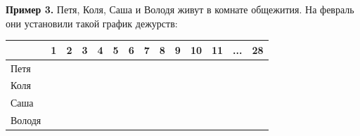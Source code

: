 \begin{multicols}{2}
\textbf{Пример 3.} Петя, Коля, Саша и Володя живут в комнате общежития. На февраль
они установили такой график дежурств:\\
\begin{tabular}{ | l | l | l | l | l | l |l | l | l | l | l | l |l | l |}
\hline
& 1& 2& 3& 4& 5& 6& 7& 8& 9& 10& 11& ... & 28\\ \hline
Петя& \cellcolor{black}& & & & \cellcolor{black}& & & & \cellcolor{black}& & & &\\ \hline
Коля& & \cellcolor{black}& & & & \cellcolor{black}& & & & \cellcolor{black}& & &\\ \hline
Саша& & & \cellcolor{black}& & & & \cellcolor{black}& & & & \cellcolor{black}& &\\ \hline
Володя& & & & \cellcolor{black}& & & & \cellcolor{black}& & & &  &\cellcolor{black}\\ \hline
\end{tabular}

\end{multicols}
\thispagestyle{empty}